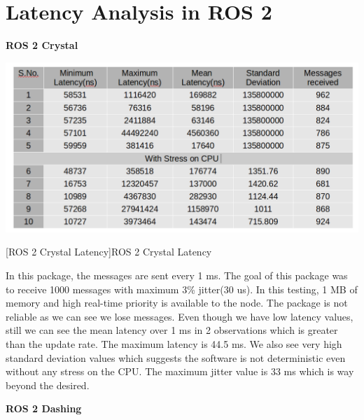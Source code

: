 \documentclass[%
xelatex,
	oneside,		%
	12pt,			%
	parskip=half,	%
	abstracton,
	chapterprefix=true%
    appendixprefix=true]
{scrbook}
\begin{document}
		\section{Latency Analysis in ROS 2}
\vspace*{0.5cm}
{\bfseries ROS 2 Crystal}
\begin{center}
\includegraphics[scale=0.4]{fig/ros2crylatency.png}

[ROS 2 Crystal Latency]{ROS 2 Crystal Latency}
\label{tab:ros2crystallatency}
\end{center}
In this package, the messages are sent every 1 ms. The goal of this package was to receive 1000 messages with maximum 3\% jitter(30 us). In this testing, 1 MB of memory and high real-time priority is available to the node. The package is not reliable as we can see we lose messages. Even though we have low latency values, still we can see the mean latency over 1 ms in 2 observations which is greater than the update rate. The maximum latency is 44.5 ms. We also see very high standard deviation values which suggests the software is not deterministic even without any stress on the CPU. The maximum jitter value is 33 ms which is way beyond the desired.
\vspace*{0.5cm}


{\bfseries ROS 2 Dashing}
\vspace*{0.5cm}
\end{document}
